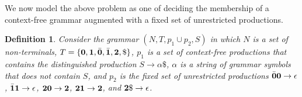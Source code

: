 \documentclass[9pt]{sigplanconf}
\newtheorem{definition}[theorem]{Definition}
\begin{document}
We now model the above problem  as one of deciding the membership of a
context-free  grammar  augmented  with  a fixed  set  of  unrestricted
productions.

\begin{definition}\label{def:specialgrammar}
Consider the  grammar $(N,T, p_1\cup p_2,S)$ in which $N$ is a set of
non-terminals, $T = \{\mathbf{0}, \mathbf{1}, \bar{\mathbf{0}}, \bar{\mathbf{1}}, {\mathbf{2}}, \$\}$, $p_1$
is a set of context-free productions that contains the distinguished
production $S \rightarrow \alpha\$$, $\alpha$ is a string of grammar
symbols that does not contain $S$, and $p_2$ is the fixed set of
unrestricted productions $\bar{\mathbf{0}}\mathbf{0} \rightarrow \epsilon$,
$\bar{\mathbf{1}}\mathbf{1} \rightarrow \epsilon$, ${\mathbf{2}}\mathbf{0} \rightarrow {\mathbf{2}}$,
${\mathbf{2}}\mathbf{1} \rightarrow {\mathbf{2}}$, and ${\mathbf{2}}\$ \rightarrow
\epsilon$.
\end{definition}
\end{document}
